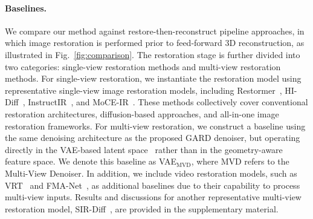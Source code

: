 \documentclass{llmxive}
\begin{document}
\paragraph{Baselines.}
We compare our method against restore-then-reconstruct pipeline approaches, in which image restoration is performed prior to feed-forward 3D reconstruction, as illustrated in Fig.~\ref{fig:comparison}. The restoration stage is further divided into two categories: single-view restoration methods and multi-view restoration methods. For single-view restoration, we instantiate the restoration model using representative single-view image restoration models, including Restormer~\cite{zamir2022restormer}, HI-Diff~\cite{chen2023hierarchical}, InstructIR~\cite{conde2024high}, and MoCE-IR~\cite{zamfir2024complexityexperts}. These methods collectively cover conventional restoration architectures, diffusion-based approaches, and all-in-one image restoration frameworks. For multi-view restoration, we construct a baseline using the same denoising architecture as the proposed GARD denoiser, but operating directly in the VAE-based latent space~\cite{kingma2013auto} rather than in the geometry-aware feature space. We denote this baseline as VAE$_\text{MVD}$, where MVD refers to the Multi-View Denoiser. In addition, we include video restoration models, such as VRT~\cite{liang2024vrt} and FMA-Net~\cite{Youk_2024_CVPR}, as additional baselines due to their capability to process multi-view inputs. Results and discussions for another representative multi-view restoration model, SIR-Diff~\cite{mao2025sir}, are provided in the supplementary material.



\end{document}
